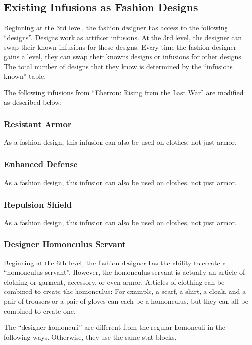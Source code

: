 \documentclass[twocolumn]{dndbook}
\begin{document}
\subsection{Existing Infusions as Fashion Designs}

Beginning at the 3rd level, the fashion designer has access to the following ``designs''.
Designs work as artificer infusions.
At the 3rd level, the designer can swap their known infusions for these designs.
Every time the fashion designer gains a level, they can swap their knowns designs or infusions for other designs.
The total number of designs that they know is determined by the ``infusions known'' table.\par

The following infusions from ``Eberron: Rising from the Last War'' are modified as described below:
\subsubsection{Resistant Armor}
As a fashion design, this infusion can also be used on clothes, not just armor.

\subsubsection{Enhanced Defense}
As a fashion design, this infusion can also be used on clothes, not just armor.

\subsubsection{Repulsion Shield}
As a fashion design, this infusion can also be used on clothes, not just armor.


\subsubsection{Designer Homonculus Servant}
Beginning at the 6th level, the fashion designer has the ability to create a ``homonculus servant''.
However, the homonculus servant is actually an article of clothing or garment, accessory, or even armor.
Articles of clothing can be combined to create the homonculus:
For example, a scarf, a shirt, a cloak, and a pair of trousers or a pair of gloves can each be a homonculus,
but they can all be combined to create one.

The ``designer homonculi'' are different from the regular homonculi in the following ways.
Otherwise, they use the same stat blocks.
\end{document}
